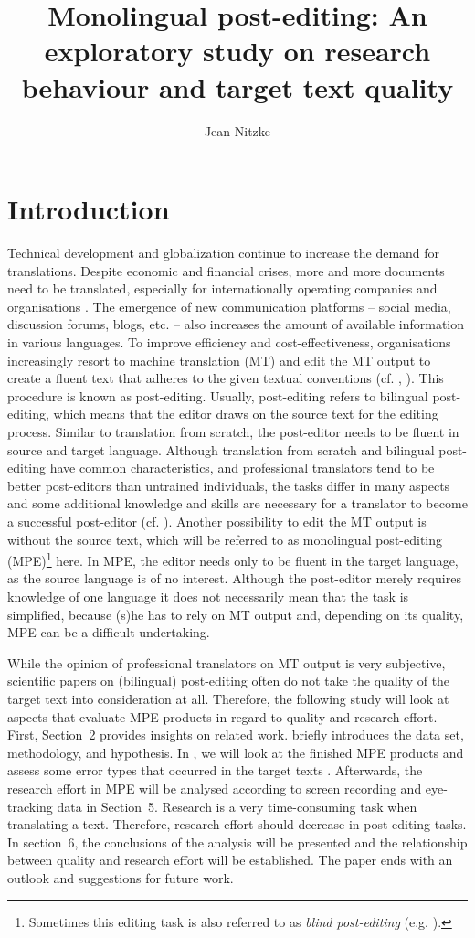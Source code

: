 \documentclass[output=paper]{langsci/langscibook}
\author{Jean Nitzke\affiliation{University of Mainz}
}
\title{Monolingual post-editing: {A}n exploratory study on research behaviour and target text quality}
\begin{document}
 
    



\section{Introduction}

Technical development and globalization continue to increase the demand for translations. Despite economic and financial crises, more and more documents need to be translated, especially for internationally operating companies and organisations \citep{Schmitt2003, DePalma2009}. The emergence of new communication platforms – social media, discussion forums, blogs, etc. – also increases the amount of available information in various languages. To improve efficiency and cost-effectiveness, organisations increasingly resort to machine translation (MT) and edit the MT output to create a fluent text that adheres to the given textual conventions (cf. \citet{obrien2011}, \citet{Elsen2012}). This procedure is known as post-editing. Usually, post-editing refers to bilingual post-editing, which means that the editor draws on the source text for the editing process. Similar to translation from scratch, the post-editor needs to be fluent in source and target language. Although translation from scratch and bilingual post-editing have common characteristics, and professional translators tend to be better post-editors than untrained individuals, the tasks differ in many aspects and some additional knowledge and skills are necessary for a translator to become a successful post-editor (cf. \citet{obrien2002}). Another possibility to edit the MT output is without the source text, which will be referred to as monolingual post-editing (MPE)\footnote{Sometimes this editing task is also referred to as \textit{blind post-editing }(e.g. \citet{carl2013}).} here. In MPE, the editor needs only to be fluent in the target language, as the source language is of no interest. Although the post-editor merely requires knowledge of one language it does not necessarily mean that the task is simplified, because (s)he has to rely on MT output and, depending on its quality, MPE can be a difficult undertaking.


While the opinion of professional translators on MT output is very subjective, scientific papers on (bilingual) post-editing often do not take the quality of the target text into consideration at all. Therefore, the following study will look at aspects that evaluate MPE products in regard to quality and research effort. First, Section~2 provides insights on related work.  briefly introduces the data set, methodology, and hypothesis. In , we will look at the finished MPE products and assess some error types that occurred in the target texts . Afterwards, the research effort in MPE will be analysed according to screen recording and eye-tracking data in Section~5. Research is a very time-consuming task when translating a text. Therefore, research effort should decrease in post-editing tasks. In section~6, the conclusions of the analysis will be presented and the relationship between quality and research effort will be established. The paper ends with an outlook and suggestions for future work.
\end{document}

